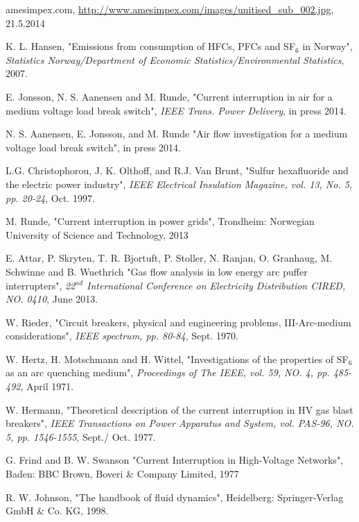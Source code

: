 \documentclass[10pt,b5paper,twoside]{article}
\begin{document}
\begin{thebibliography}{10}

 amesimpex.com, \url{http://www.amesimpex.com/images/unitised_sub_002.jpg}, 21.5.2014

 K. L. Hansen, "Emissions from consumption of HFCs, PFCs and SF$_6$ in Norway", \textit{Statistics Norway/Department of Economic Statistics/Environmental Statistics}, 2007.

 E. Jonsson, N. S. Aanensen and M. Runde, "Current interruption in air for a medium voltage load break switch", \textit{IEEE Trans. Power Delivery}, in press 2014.

 N. S. Aanensen, E. Jonsson, and M. Runde "Air flow investigation for a medium voltage load break switch", in press 2014.

 L.G. Christophorou, J. K. Olthoff, and R.J. Van Brunt, "Sulfur hexafluoride and the electric power industry", \textit{IEEE Electrical Insulation Magazine, vol. 13, No. 5, pp. 20-24}, Oct. 1997.


 M. Runde, "Current interruption in power grids", Trondheim: Norwegian University of Science and Technology, 2013

 E. Attar, P. Skryten, T. R. Bjortuft, P. Stoller, N. Ranjan, O. Granhaug, M. Schwinne and B. Wuethrich "Gas flow analysis in low energy arc puffer interrupters", \textit{22$^{nd}$ International Conference on Electricity Distribution CIRED, NO. 0410}, June 2013.

 W. Rieder, "Circuit breakers, physical and engineering problems, III-Arc-medium considerations", \textit{IEEE spectrum, pp. 80-84}, Sept. 1970.

 W. Hertz, H. Motschmann and H. Wittel, "Investigations of the properties of SF$_6$ as an arc quenching medium", \textit{Proceedings of The IEEE, vol. 59, NO. 4, pp. 485-492}, April 1971.

 W. Hermann, "Theoretical description of the current interruption in HV gas blast breakers", \textit{IEEE Transactions on Power Apparatus and System, vol. PAS-96, NO. 5, pp. 1546-1555}, Sept./ Oct. 1977.

 G. Frind and B. W. Swanson "Current Interruption in High-Voltage Networks", Baden: BBC Brown, Boveri \& Company Limited, 1977

 R. W. Johnson, "The handbook of fluid dynamics", Heidelberg: Springer-Verlag GmbH \& Co. KG, 1998.


\end{thebibliography}
\end{document}
